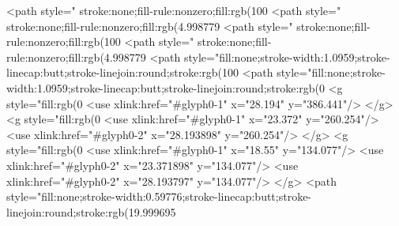 <path style=" stroke:none;fill-rule:nonzero;fill:rgb(100%
<path style=" stroke:none;fill-rule:nonzero;fill:rgb(4.998779%
<path style=" stroke:none;fill-rule:nonzero;fill:rgb(100%
<path style=" stroke:none;fill-rule:nonzero;fill:rgb(4.998779%
<path style="fill:none;stroke-width:1.0959;stroke-linecap:butt;stroke-linejoin:round;stroke:rgb(100%
<path style="fill:none;stroke-width:1.0959;stroke-linecap:butt;stroke-linejoin:round;stroke:rgb(0%
<g style="fill:rgb(0%
  <use xlink:href="#glyph0-1" x="28.194" y="386.441"/>
</g>
<g style="fill:rgb(0%
  <use xlink:href="#glyph0-1" x="23.372" y="260.254"/>
  <use xlink:href="#glyph0-2" x="28.193898" y="260.254"/>
</g>
<g style="fill:rgb(0%
  <use xlink:href="#glyph0-1" x="18.55" y="134.077"/>
  <use xlink:href="#glyph0-2" x="23.371898" y="134.077"/>
  <use xlink:href="#glyph0-2" x="28.193797" y="134.077"/>
</g>
<path style="fill:none;stroke-width:0.59776;stroke-linecap:butt;stroke-linejoin:round;stroke:rgb(19.999695%

